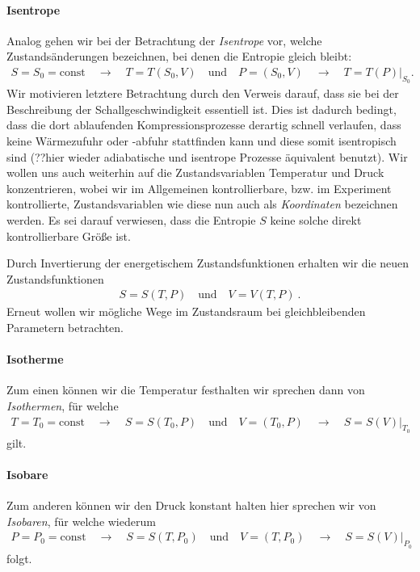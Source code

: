 \paragraph*{Isentrope}
Analog gehen wir bei der Betrachtung der \emph{Isentrope} vor, welche Zustandsänderungen bezeichnen, bei denen die Entropie gleich bleibt:
\begin{align*}
    S=S_0=\mathrm{const}\quad\rightarrow\quad T=T(S_0,V) \quad\text{und}\quad P=(S_0,V) \quad\rightarrow\quad T=T(P)|_{S_0}.
\end{align*}
Wir motivieren letztere Betrachtung durch den Verweis darauf, dass sie bei der Beschreibung der Schallgeschwindigkeit essentiell ist. Dies ist dadurch bedingt, dass die dort ablaufenden Kompressionsprozesse derartig schnell verlaufen, dass keine Wärmezufuhr oder -abfuhr stattfinden kann und diese somit isentropisch sind (??hier wieder adiabatische und isentrope Prozesse äquivalent benutzt).
Wir wollen uns auch weiterhin auf die Zustandsvariablen Temperatur und Druck konzentrieren, wobei wir im Allgemeinen kontrollierbare, bzw. im Experiment kontrollierte, Zustandsvariablen \textendash{} wie diese \textendash{} nun auch als \emph{Koordinaten} bezeichnen werden. Es sei darauf verwiesen, dass die Entropie $S$ keine solche direkt kontrollierbare Größe ist.

Durch Invertierung der energetischem Zustandsfunktionen erhalten wir die neuen Zustandsfunktionen
\begin{align*}
    \boxed{S=S(T,P) \quad\mathrm{und}\quad V=V(T,P)}\:.
\end{align*}
Erneut wollen wir mögliche Wege im Zustandsraum bei gleichbleibenden Parametern betrachten.


\paragraph*{Isotherme}
Zum einen können wir die Temperatur festhalten \textendash{} wir sprechen dann von \emph{Isothermen}, für welche
\begin{align*}
    T=T_0=\mathrm{const}\quad\rightarrow\quad S=S(T_0,P) \quad\text{und}\quad V=(T_0,P) \quad\rightarrow\quad S=S(V)|_{T_0}
\end{align*}
gilt.



\paragraph*{Isobare}
Zum anderen können wir den Druck konstant halten \textendash{} hier sprechen wir von \emph{Isobaren}, für welche wiederum
\begin{align*}
    P=P_0=\mathrm{const}\quad\rightarrow\quad S=S(T,P_0) \quad\text{und}\quad V=(T,P_0) \quad\rightarrow\quad S=S(V)|_{P_0}
\end{align*}
folgt.

